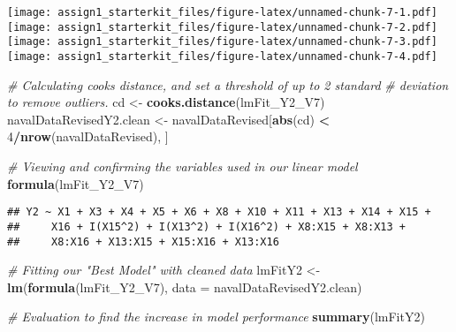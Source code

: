 \documentclass[
]{article}
\newenvironment{Shaded}{\begin{snugshade}}{\end{snugshade}}
\newcommand{\CommentTok}[1]{\textcolor[rgb]{0.56,0.35,0.01}{\textit{#1}}}
\newcommand{\DataTypeTok}[1]{\textcolor[rgb]{0.13,0.29,0.53}{#1}}
\newcommand{\DecValTok}[1]{\textcolor[rgb]{0.00,0.00,0.81}{#1}}
\newcommand{\KeywordTok}[1]{\textcolor[rgb]{0.13,0.29,0.53}{\textbf{#1}}}
\newcommand{\NormalTok}[1]{#1}
\newcommand{\OperatorTok}[1]{\textcolor[rgb]{0.81,0.36,0.00}{\textbf{#1}}}
\newcommand{\StringTok}[1]{\textcolor[rgb]{0.31,0.60,0.02}{#1}}
\begin{document}
\texttt{[image: assign1\_starterkit\_files/figure-latex/unnamed-chunk-7-1.pdf]}
\texttt{[image: assign1\_starterkit\_files/figure-latex/unnamed-chunk-7-2.pdf]}
\texttt{[image: assign1\_starterkit\_files/figure-latex/unnamed-chunk-7-3.pdf]}
\texttt{[image: assign1\_starterkit\_files/figure-latex/unnamed-chunk-7-4.pdf]}

\begin{Shaded}
\begin{Highlighting}[]
\CommentTok{# Calculating cooks distance, and set a threshold of up to 2 standard}
\CommentTok{# deviation to remove outliers.}
\NormalTok{cd <-}\StringTok{ }\KeywordTok{cooks.distance}\NormalTok{(lmFit_Y2_V7)}
\NormalTok{navalDataRevisedY2.clean <-}\StringTok{ }\NormalTok{navalDataRevised[}\KeywordTok{abs}\NormalTok{(cd) }\OperatorTok{<}\StringTok{ }\DecValTok{4}\OperatorTok{/}\KeywordTok{nrow}\NormalTok{(navalDataRevised), ]}

\CommentTok{# Viewing and confirming the variables used in our linear model}
\KeywordTok{formula}\NormalTok{(lmFit_Y2_V7)}
\end{Highlighting}
\end{Shaded}

\begin{verbatim}
## Y2 ~ X1 + X3 + X4 + X5 + X6 + X8 + X10 + X11 + X13 + X14 + X15 + 
##     X16 + I(X15^2) + I(X13^2) + I(X16^2) + X8:X15 + X8:X13 + 
##     X8:X16 + X13:X15 + X15:X16 + X13:X16
\end{verbatim}

\begin{Shaded}
\begin{Highlighting}[]
\CommentTok{# Fitting our "Best Model" with cleaned data}
\NormalTok{lmFitY2 <-}\StringTok{ }\KeywordTok{lm}\NormalTok{(}\KeywordTok{formula}\NormalTok{(lmFit_Y2_V7), }\DataTypeTok{data =}\NormalTok{ navalDataRevisedY2.clean)}

\CommentTok{# Evaluation to find the increase in model performance}
\KeywordTok{summary}\NormalTok{(lmFitY2)}
\end{Highlighting}
\end{Shaded}
\end{document}

